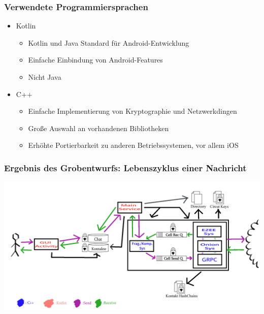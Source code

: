 \documentclass[t]{beamer}
\begin{document}
   		
   	

    \begin{frame}
        \frametitle{Verwendete Programmiersprachen}
        \pause

        \begin{itemize}
            \item
                Kotlin
                \begin{itemize}
                    \item
                        Kotlin und Java Standard für Android-Entwicklung

                    \item
                        Einfache Einbindung von Android-Features

                    \item
                        Nicht Java
                        \pause
                \end{itemize}

            \item
                C++
                \begin{itemize}
                    \item
                        Einfache Implementierung von Kryptographie und Netzwerkdingen

                    \item
                        Große Auswahl an vorhandenen Bibliotheken

                    \item
                        Erhöhte Portierbarkeit zu anderen Betriebssystemen, vor allem iOS
                \end{itemize}
        \end{itemize}
    \end{frame}

    \begin{frame}
        \frametitle{Ergebnis des Grobentwurfs: Lebenszyklus einer Nachricht}
        \pause

        \centering\includegraphics[scale=0.17]{Hydra_Cell_Cyclus.png}
    \end{frame}
\end{document}
